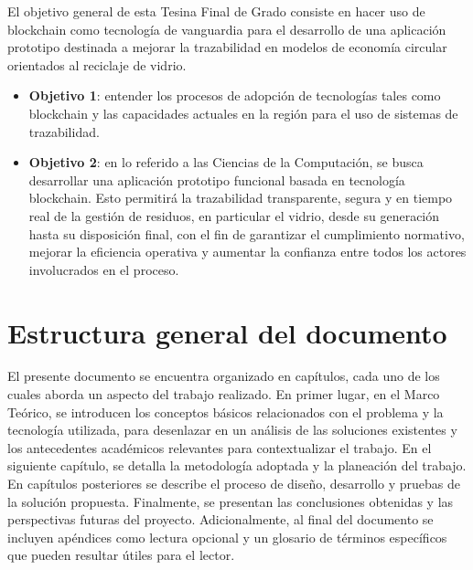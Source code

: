 El objetivo general de esta Tesina Final de Grado consiste en hacer uso de blockchain como tecnología de vanguardia para el desarrollo de una aplicación prototipo destinada a mejorar la trazabilidad en modelos de economía circular orientados al reciclaje de vidrio.

\begin{itemize}
	\item \textbf{Objetivo 1}: entender los procesos de adopción de tecnologías tales como blockchain y las capacidades actuales en la región para el uso de sistemas de trazabilidad.
	\item \textbf{Objetivo 2}: en lo referido a las Ciencias de la Computación, se busca desarrollar una aplicación prototipo funcional basada en tecnología blockchain. Esto permitirá la trazabilidad transparente, segura y en tiempo real de la gestión de residuos, en particular el vidrio, desde su generación hasta su disposición final, con el fin de garantizar el cumplimiento normativo, mejorar la eficiencia operativa y aumentar la confianza entre todos los actores involucrados en el proceso.
\end{itemize}

\section{Estructura general del documento}

El presente documento se encuentra organizado en capítulos, cada uno de los cuales aborda un aspecto del trabajo realizado. En primer lugar, en el Marco Teórico, se introducen los conceptos básicos relacionados con el problema y la tecnología utilizada, para desenlazar en un análisis de las soluciones existentes y los antecedentes académicos relevantes para contextualizar el trabajo. En el siguiente capítulo, se detalla la metodología adoptada y la planeación del trabajo. En capítulos posteriores se describe el proceso de diseño, desarrollo y pruebas de la solución propuesta. Finalmente, se presentan las conclusiones obtenidas y las perspectivas futuras del proyecto. Adicionalmente, al final del documento se incluyen apéndices como lectura opcional y un glosario de términos específicos que pueden resultar útiles para el lector.
